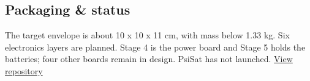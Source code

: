 \subsection*{Packaging \& status}
The target envelope is about 10 x 10 x 11 cm, with mass below 1.33 kg. Six electronics layers are planned. Stage 4 is the power board and Stage 5 holds the batteries; four other boards remain in design. PsiSat has not launched.
\medskip\href{https://github.com/leosgxsbu/Psi_Sat-1U-CubeSat-}{View repository}